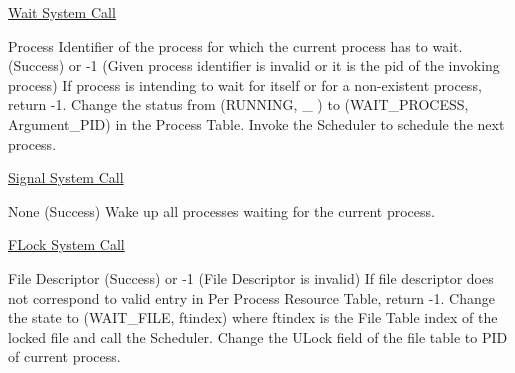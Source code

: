 
\begin{algorithm}
\caption{\href{http://exposnitc.github.io/os_design-files/synchronization_algos.html#wait}{Wait System Call}}
\begin{algorithmic}
\REQUIRE Process Identifier of the process for which the current process has to wait.
 (Success) or -1 (Given process identifier is invalid or it is the pid of the invoking process)
\STATE If process is intending to wait for itself or for a non-existent process, return -1.    
\STATE Change the status from (RUNNING, \_ ) to (WAIT\_PROCESS, Argument\_PID) in the Process Table.
\STATE Invoke the Scheduler to schedule the next process.
\end{algorithmic}
\end{algorithm}


\begin{algorithm}
\caption{\href{http://exposnitc.github.io/os_design-files/synchronization_algos.html#signal}{Signal System Call}}
\begin{algorithmic}
\REQUIRE None
 (Success) 
\STATE Wake up all processes waiting for the current process.
\end{algorithmic}
\end{algorithm}


\begin{algorithm}
\caption{\href{http://exposnitc.github.io/os_design-files/synchronization_algos.html#flock}{FLock System Call}}
\begin{algorithmic}
\REQUIRE File Descriptor
 (Success) or -1 (File Descriptor is invalid)
\STATE If file descriptor does not correspond to valid entry in Per Process Resource Table, return -1.
    \STATE Change the state to (WAIT\_FILE, ftindex) where ftindex is the File Table index of the locked file and call the Scheduler.
\ENDWHILE
\STATE Change the ULock field of the file table to PID of current process.     
\end{algorithmic}
\end{algorithm}

